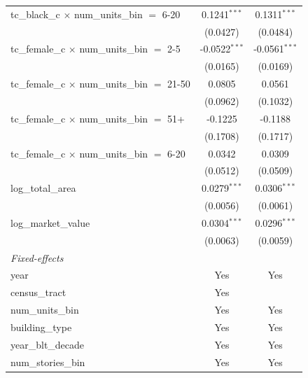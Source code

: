 \begin{tabular}{lcc}
   tc\_black\_c $\times$ num\_units\_bin $=$ 6-20        & 0.1241$^{***}$  & 0.1311$^{***}$\\   
                                                         & (0.0427)        & (0.0484)\\   
   tc\_female\_c $\times$ num\_units\_bin $=$ 2-5        & -0.0522$^{***}$ & -0.0561$^{***}$\\   
                                                         & (0.0165)        & (0.0169)\\   
   tc\_female\_c $\times$ num\_units\_bin $=$ 21-50      & 0.0805          & 0.0561\\   
                                                         & (0.0962)        & (0.1032)\\   
   tc\_female\_c $\times$ num\_units\_bin $=$ 51+        & -0.1225         & -0.1188\\   
                                                         & (0.1708)        & (0.1717)\\   
   tc\_female\_c $\times$ num\_units\_bin $=$ 6-20       & 0.0342          & 0.0309\\   
                                                         & (0.0512)        & (0.0509)\\   
   log\_total\_area                                      & 0.0279$^{***}$  & 0.0306$^{***}$\\   
                                                         & (0.0056)        & (0.0061)\\   
   log\_market\_value                                    & 0.0304$^{***}$  & 0.0296$^{***}$\\   
                                                         & (0.0063)        & (0.0059)\\   
   \midrule
   \emph{Fixed-effects}\\
   year                                                  & Yes             & Yes\\  
   census\_tract                                         & Yes             & \\  
   num\_units\_bin                                       & Yes             & Yes\\  
   building\_type                                        & Yes             & Yes\\  
   year\_blt\_decade                                     & Yes             & Yes\\  
   num\_stories\_bin                                     & Yes             & Yes\\  

\end{tabular}
